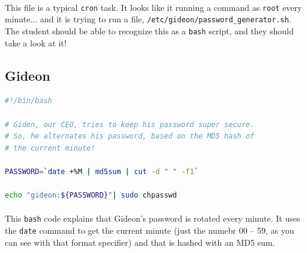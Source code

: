 \documentclass[11pt]{article}
\begin{document}
	\paragraph{} This file is a typical \texttt{cron} task. It looks like it running a command as \texttt{root} every minute... and it is trying to run a file, \texttt{/etc/gideon/password\_generator.sh}. The student should be able to recognize this as a \texttt{bash} script, and they should take a look at it!


	\begin{center}
		\graphicspath{ {.} }
		\centering
	\end{center}

\newpage

\subsection{Gideon}

\begin{lstlisting}[language=bash]
#!/bin/bash

# Giden, our CEO, tries to keep his password super secure.
# So, he alternates his password, based on the MD5 hash of
# the current minute!

PASSWORD=`date +%M | md5sum | cut -d " " -f1`

echo "gideon:${PASSWORD}"| sudo chpasswd
\end{lstlisting}

	\hrulefill

	\paragraph{}

	\paragraph{} This \texttt{bash} code explains that Gideon's password is rotated every minute. It uses the \texttt{date} command to get the current minute (just the numebr 00 -- 59, as you can see with that format specifier) and that is hashed with an MD5 sum. 
\end{document}
